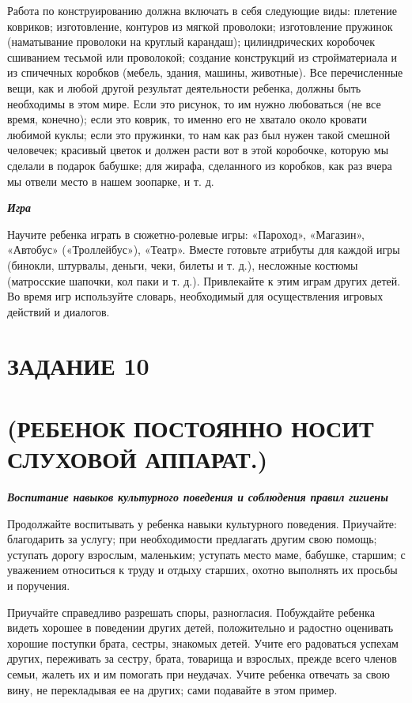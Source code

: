 \documentclass[a5paper]{book}
\renewcommand{\emph}[1]{\textit{#1}}
\begin{document}
Работа по конструированию должна включать в себя следующие виды:
плетение ковриков; изготовление, контуров из мягкой проволоки;
изготовление пружинок (наматывание проволоки на круглый карандаш);
цилиндрических коробочек сшиванием тесьмой или проволокой; создание
конструкций из стройматериала и из спичечных коробков (мебель, здания,
машины, животные). Все перечисленные вещи, как и любой другой результат
деятельности ребенка, должны быть необходимы в этом мире. Если это
рисунок, то им нужно любоваться (не все время, конечно); если это
коврик, то именно его не хватало около кровати любимой куклы; если это
пружинки, то нам как раз был нужен такой смешной человечек; красивый
цветок и должен расти вот в этой коробочке, которую мы сделали в подарок
бабушке; для жирафа, сделанного из коробков, как раз вчера мы отвели
место в нашем зоопарке, и т. д.

\emph{\textbf{Игра}}

Научите ребенка играть в сюжетно-ролевые игры: «Пароход», «Магазин»,
«Автобус» («Троллейбус»), «Театр». Вместе готовьте атрибуты для каждой
игры (бинокли, штурвалы, деньги, чеки, билеты и т. д.), несложные
костюмы (матросские шапочки, кол паки и т. д.). Привлекайте к этим играм
других детей. Во время игр используйте словарь, необходимый для
осуществления игровых действий и диалогов.

\section{ЗАДАНИЕ 10}\section*{(РЕБЕНОК ПОСТОЯННО НОСИТ СЛУХОВОЙ АППАРАТ.)}

\textbf{\emph{Воспитание навыков культурного поведения и соблюдения
правил гигиены}}

Продолжайте воспитывать у ребенка навыки культурного поведения.
Приучайте: благодарить за услугу; при необходимости предлагать другим
свою помощь; уступать дорогу взрослым, маленьким; уступать место маме,
бабушке, старшим; с уважением относиться к труду и отдыху старших,
охотно выполнять их просьбы и поручения.

Приучайте справедливо разрешать споры, разногласия. Побуждайте ребенка
видеть хорошее в поведении других детей, положительно и радостно
оценивать хорошие поступки брата, сестры, знакомых детей. Учите его
радоваться успехам других, переживать за сестру, брата, товарища и
взрослых, прежде всего членов семьи, жалеть их и им помогать при
неудачах. Учите ребенка отвечать за свою вину, не перекладывая ее на
других; сами подавайте в этом пример.
\end{document}
